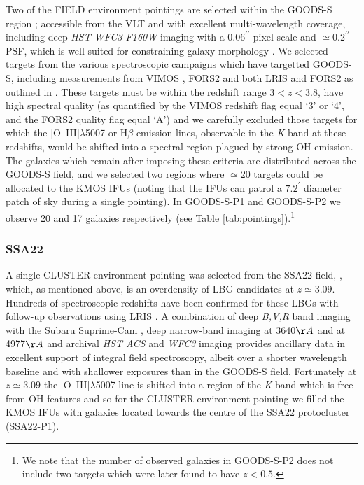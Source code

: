 \documentclass[fleqn,usenatbib]{mn2e}
\begin{document}
Two of the FIELD environment pointings are selected within the GOODS-S region \citep{Guo2013}; accessible from the VLT and with excellent multi-wavelength coverage, including deep {\em HST WFC3 F160W} imaging with a $0.06^{\prime\prime}$ pixel scale and $\simeq0.2^{\prime\prime}$ PSF, which is well suited for constraining galaxy morphology \citep{Grogin2011,Koekemoer2011}.
We selected targets from the various spectroscopic campaigns which have targetted GOODS-S, including measurements from VIMOS \citep{Balestra2010,Cassata2014}, FORS2 \citep{Vanzella2005,Vanzella2006,Vanzella2008} and both LRIS and FORS2 as outlined in \cite{Wuyts2009}.
These targets must be within the redshift range $3 < z < 3.8$, have high spectral quality (as quantified by the VIMOS redshift flag equal `3' or `4', and the FORS2 quality flag equal `A') and we carefully excluded those targets for which the [O~{\sc III}]$\lambda$5007 or H$\beta$ emission lines, observable in the {\it K}-band at these redshifts, would be shifted into a spectral region plagued by strong OH emission.
The galaxies which remain after imposing these criteria are distributed across the GOODS-S field, and we selected two regions where $\simeq20$ targets could be allocated to the KMOS IFUs (noting that the IFUs can patrol a $7.2^{\prime}$ diameter patch of sky during a single pointing).
In GOODS-S-P1 and GOODS-S-P2 we observe 20 and 17 galaxies respectively (see Table \ref{tab:pointings}).\footnote{We note that the number of observed galaxies in GOODS-S-P2 does not include two targets which were later found to have $z < 0.5$.}

\subsubsection{SSA22}\label{subsubsec:sample_selection_ssa}
A single CLUSTER environment pointing was selected from the SSA22 field, \citep{Steidel1998,Steidel2000,Steidel2003,Shapley2003}, which, as mentioned above, is an overdensity of LBG candidates at $z\simeq3.09$.
Hundreds of spectroscopic redshifts have been confirmed for these LBGs with follow-up observations using LRIS \citep{Shapley2003,Nestor2013}.
A combination of deep {\em B,V,R} band imaging with the Subaru Suprime-Cam \citep{Matsuda2004}, deep narrow-band imaging at 3640$\AA$ \citep{Matsuda2004} and at 4977$\AA$ \citep{Nestor2011,Yamada2012a} and archival {\em HST ACS} and {\it WFC3} imaging provides ancillary data in excellent support of integral field spectroscopy, albeit over a shorter wavelength baseline and with shallower exposures than in the GOODS-S field.
Fortunately at $z\simeq3.09$ the [O~{\sc III}]$\lambda$5007 line is shifted into a region of the {\it K}-band which is free from OH features and so for the CLUSTER environment pointing we filled the KMOS IFUs with galaxies located towards the centre of the SSA22 protocluster (SSA22-P1).
\end{document}
